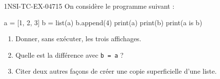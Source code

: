 \begin{exercice}{1NSI-TC-EX-047}{1}{5}
On considère le programme suivant :
\begin{python}
a = [1, 2, 3]
b = list(a)
b.append(4)
print(a)
print(b)
print(a is b)
\end{python}
\begin{enumerate}
  \item Donner, sans exécuter, les trois affichages.
  \item Quelle est la différence avec \lstinline{b = a} ?
  \item Citer deux autres façons de créer une copie superficielle d'une liste.
\end{enumerate}
\end{exercice}
